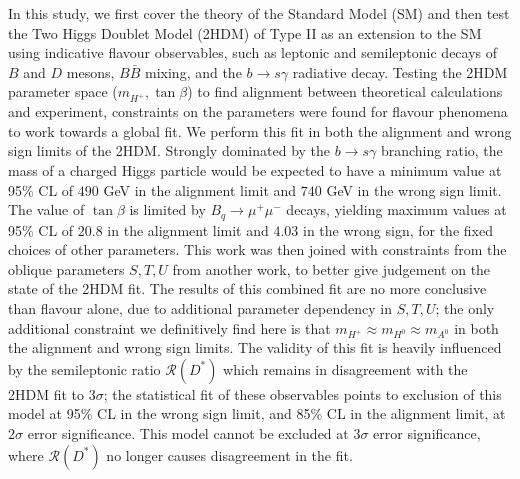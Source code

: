 \documentclass[10pt]{article} %
\begin{document}
\begin{paracol}{2}
In this study, we first cover the theory of the Standard Model (SM) and then test the Two Higgs Doublet Model (2HDM) of Type II as an extension to the SM using indicative flavour observables, such as leptonic and semileptonic decays of $B$ and $D$ mesons, $B\bar{B}$ mixing, and the $b\to s\gamma$ radiative decay.
Testing the 2HDM parameter space ($m_{H^+},\tan\beta$) to find alignment between theoretical calculations and experiment, constraints on the parameters were found for flavour phenomena to work towards a global fit.
We perform this fit in both the alignment and wrong sign limits of the 2HDM.
Strongly dominated by the $b\to s\gamma$ branching ratio, the mass of a charged Higgs particle would be expected to have a minimum value at 95\% CL of $490$ GeV in the alignment limit and $740$ GeV in the wrong sign limit.
The value of $\tan\beta$ is limited by $B_q\to\mu^+\mu^-$ decays, yielding maximum values at 95\% CL of $20.8$ in the alignment limit and $4.03$ in the wrong sign, for the fixed choices of other parameters.
This work was then joined with constraints from the oblique parameters $S,T,U$ from another work, to better give judgement on the state of the 2HDM fit.
The results of this combined fit are no more conclusive than flavour alone, due to additional parameter dependency in $S,T,U$; the only additional constraint we definitively find here is that $m_{H^+}\approx m_{H^0}\approx m_{A^0}$ in both the alignment and wrong sign limits.
The validity of this fit is heavily influenced by the semileptonic ratio $\mathcal{R}(D^*)$ which remains in disagreement with the 2HDM fit to $3\sigma$; the statistical fit of these observables points to exclusion of this model at 95\% CL in the wrong sign limit, and 85\% CL in the alignment limit, at $2\sigma$ error significance.
This model cannot be excluded at $3\sigma$ error significance, where $\mathcal{R}(D^*)$ no longer causes disagreement in the fit.



\vspace{-\baselineskip}\medskip %



\end{paracol}
\end{document}
